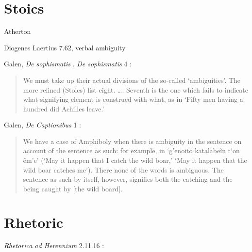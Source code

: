 \documentclass{article}
\newcommand{\textgreek}[1]{\begingroup\fontencoding{LGR}\selectfont#1\endgroup}
\begin{document}
\section{Stoics}
Atherton \cite{atherton}

Diogenes Laertius 7.62, verbal ambiguity

Galen, {\em De sophismatis} \cite[pp.~582--598]{galen20}. {\em De sophismatis} 4 \cite[p.~228]{LS1}:

\begin{quote}
We must take up their actual divisions of the so-called `ambiguities'. The more refined (Stoics) list eight. \dots.
Seventh is the one which fails to indicate what signifying element is construed with what, as in `Fifty men having a hundred did Achilles
leave.'
\end{quote}

Galen, {\em De Captionibus} 1 \cite[p.~89*]{captionibus}:

\begin{quote}
We have a case of Amphiboly when there is ambiguity in the
sentence on account of the sentence as such: for example, in
`\textgreek{g'enoito katalabe{\~i}n t`on \~<un >em'e}' (`May it happen that I catch the
wild boar,' `May it happen that the wild boar catches me'). There none
of the words is ambiguous. The sentence as such by itself, however,
signifies both the catching and the being caught by [the wild board].
\end{quote}














\section{Rhetoric}
{\em Rhetorica ad Herennium} 2.11.16 \cite[pp.~85--87]{LCL403}:
\end{document}
